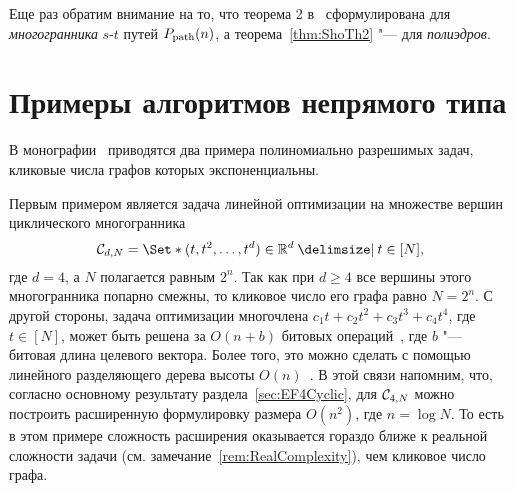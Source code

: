 Еще раз обратим внимание на то, что теорема 2 в~\cite{Bondarenko:1993SW3A} сформулирована для \emph{многогранника} $s$-$t$ путей $P_{\textup{path}}(n)$, а теорема~\ref{thm:ShoTh2} "--- для \emph{полиэдров}. 


%
%

\section{Примеры алгоритмов непрямого типа}
\label{sec:NondirectAlg}

В монографии~\cite{BondBook:1995} приводятся два примера полиномиально разрешимых задач, кликовые числа графов которых экспоненциальны.

Первым примером является задача линейной оптимизации на множестве вершин циклического многогранника
\[
\CP_{d,N} = \Set*{(t, t^2, \dots, t^d) \in \R^d \given t \in [N]},
\]
где $d = 4$, а $N$ полагается равным $2^n$. Так как при $d \ge 4$ все вершины этого многогранника попарно смежны, то кликовое число его графа равно $N = 2^n$. С другой стороны, задача оптимизации многочлена $c_1 t + c_2 t^2 + c_3 t^3 + c_4 t^4$, где $t \in [N]$, может быть решена за $O(n+b)$ битовых операций~\cite{Pan:1996,Sagraloff:2016}, где $b$ "--- битовая длина целевого вектора. Более того, это можно сделать с помощью линейного разделяющего дерева высоты $O(n)$~\cite{BondBook:1995}.
В этой связи напомним, что, согласно основному результату раздела~\ref{sec:EF4Cyclic}, для ${\mathcal C}_{4,N}$ можно построить расширенную формулировку размера $O(n^2)$, где $n = \log N$. То есть в этом примере сложность расширения оказывается гораздо ближе к реальной сложности задачи (см. замечание~\ref{rem:RealComplexity}), чем кликовое число графа. 

